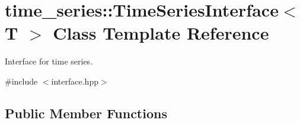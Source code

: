 \hypertarget{classtime__series_1_1TimeSeriesInterface}{}\section{time\+\_\+series\+:\+:Time\+Series\+Interface$<$ T $>$ Class Template Reference}
\label{classtime__series_1_1TimeSeriesInterface}


Interface for time series.  




{\ttfamily \#include $<$interface.\+hpp$>$}

\subsection*{Public Member Functions}
